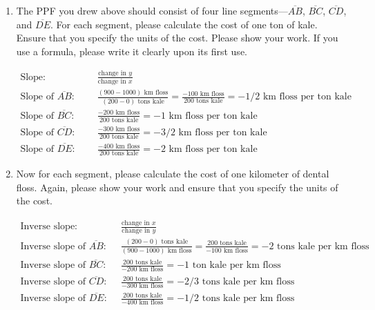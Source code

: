 \documentclass[
    letterpaper,paper=portrait,fleqn,
    DIV=16,fontsize=12pt,twoside=semi,
    parskip=full-,
    headings=standardclasses]
{scrartcl}
\begin{document}
\begin{enumerate}
\item The PPF you drew above should consist of four line segments---$\overline{AB}$, $\overline{BC}$, $\overline{CD}$, and $\overline{DE}$. For each segment, please calculate the cost of one ton of kale. Ensure that you specify the units of the cost. Please show your work. If you use a formula, please write it clearly upon its first use.
\begin{solution}
\vspace{-\baselineskip}
\begin{align*}
\text{Slope:} &&& \frac{\text{change in $y$}}{\text{change in $x$}} \\
\text{Slope of $\overline{AB}$:} &&& \frac{(900-1000)\text{ km floss}}{(200-0)\text{ tons kale}} = \frac{-100\text{ km floss}}{200\text{ tons kale}} = -1/2 \text{ km floss per ton kale} \\
\text{Slope of $\overline{BC}$:} &&& \frac{-200\text{ km floss}}{200\text{ tons kale}} = -1 \text{ km floss per ton kale} \\
\text{Slope of $\overline{CD}$:} &&& \frac{-300\text{ km floss}}{200\text{ tons kale}} = -3/2 \text{ km floss per ton kale} \\
\text{Slope of $\overline{DE}$:} &&& \frac{-400\text{ km floss}}{200\text{ tons kale}} = -2 \text{ km floss per ton kale}
\end{align*}
\end{solution}

\item Now for each segment, please calculate the cost of one kilometer of dental floss. Again, please show your work and ensure that you specify the units of the cost.
\begin{solution}
\vspace{-\baselineskip}
\begin{align*}
\text{Inverse slope:} &&& \frac{\text{change in $x$}}{\text{change in $y$}} \\
\text{Inverse slope of $\overline{AB}$:} &&& \frac{(200-0)\text{ tons kale}}{(900-1000)\text{ km floss}} = \frac{200\text{ tons kale}}{-100\text{ km floss}} = -2 \text{ tons kale per km floss} \\
\text{Inverse slope of $\overline{BC}$:} &&& \frac{200\text{ tons kale}}{-200\text{ km floss}} = -1 \text{ ton kale per km floss} \\
\text{Inverse slope of $\overline{CD}$:} &&& \frac{200\text{ tons kale}}{-300\text{ km floss}} = -2/3 \text{ tons kale per km floss} \\
\text{Inverse slope of $\overline{DE}$:} &&& \frac{200\text{ tons kale}}{-400\text{ km floss}} = -1/2 \text{ tons kale per km floss}
\end{align*}
\end{solution}


\end{enumerate}
\end{document}
